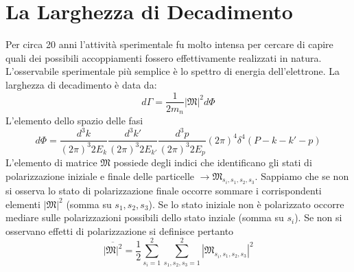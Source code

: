 \section{La Larghezza di Decadimento}
Per circa 20 anni l'attività sperimentale fu molto intensa per cercare di capire quali dei possibili accoppiamenti fossero effettivamente realizzati in natura. L'osservabile sperimentale più semplice è lo spettro di energia dell'elettrone. La larghezza di decadimento è data da:
$$
d\Gamma = \frac{1}{2m_n} |\mathfrak{M}|^2 d\Phi
$$
L'elemento dello spazio delle fasi
$$
d\Phi = \frac{d^3 k}{(2\pi)^3 2E_k} \frac{d^3 k'}{(2\pi)^3 2E_{k'}} \frac{d^3 p}{(2\pi)^3 2E_p} (2\pi)^4 \delta^4(P - k - k' - p)
$$
L'elemento di matrice $\mathfrak{M}$ possiede degli indici che identificano gli stati di polarizzazione iniziale e finale delle particelle $\to\mathfrak{M}_{s_i,s_1,s_2,s_3}$. Sappiamo che se non si osserva lo stato di polarizzazione finale occorre sommare i corrispondenti elementi $|\mathfrak{M}|^2$ (somma su $s_1,s_2,s_3$). Se lo stato iniziale non è polarizzato occorre mediare sulle polarizzazioni possibili dello stato inziale (somma su $s_i$). Se non si osservano effetti di polarizzazione si definisce pertanto
$$
\overline{|\mathfrak{M}|^2} = \frac{1}{2} \sum_{s_i=1}^2 \sum_{s_1, s_2, s_3=1}^2 |\mathfrak{M}_{s_i, s_1, s_2, s_3}|^2
$$
